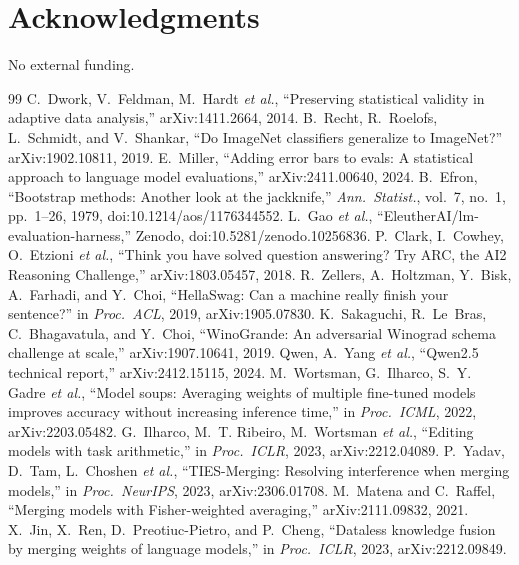 \documentclass[conference]{IEEEtran}
\begin{document}
\section*{Acknowledgments}
No external funding.

\begin{thebibliography}{99}
 C.~Dwork, V.~Feldman, M.~Hardt \emph{et al.}, ``Preserving statistical validity in adaptive data analysis,'' arXiv:1411.2664, 2014.
 B.~Recht, R.~Roelofs, L.~Schmidt, and V.~Shankar, ``Do ImageNet classifiers generalize to ImageNet?'' arXiv:1902.10811, 2019.
 E.~Miller, ``Adding error bars to evals: A statistical approach to language model evaluations,'' arXiv:2411.00640, 2024.
 B.~Efron, ``Bootstrap methods: Another look at the jackknife,'' \emph{Ann.\ Statist.}, vol.~7, no.~1, pp.~1--26, 1979, doi:10.1214/aos/1176344552.
 L.~Gao \emph{et al.}, ``EleutherAI/lm-evaluation-harness,'' Zenodo, doi:10.5281/zenodo.10256836.
 P.~Clark, I.~Cowhey, O.~Etzioni \emph{et al.}, ``Think you have solved question answering? Try ARC, the AI2 Reasoning Challenge,'' arXiv:1803.05457, 2018.
 R.~Zellers, A.~Holtzman, Y.~Bisk, A.~Farhadi, and Y.~Choi, ``HellaSwag: Can a machine really finish your sentence?'' in \emph{Proc.\ ACL}, 2019, arXiv:1905.07830.
 K.~Sakaguchi, R.~Le~Bras, C.~Bhagavatula, and Y.~Choi, ``WinoGrande: An adversarial Winograd schema challenge at scale,'' arXiv:1907.10641, 2019.
 Qwen, A.~Yang \emph{et al.}, ``Qwen2.5 technical report,'' arXiv:2412.15115, 2024.
 M.~Wortsman, G.~Ilharco, S.~Y. Gadre \emph{et al.}, ``Model soups: Averaging weights of multiple fine-tuned models improves accuracy without increasing inference time,'' in \emph{Proc.\ ICML}, 2022, arXiv:2203.05482.
 G.~Ilharco, M.~T. Ribeiro, M.~Wortsman \emph{et al.}, ``Editing models with task arithmetic,'' in \emph{Proc.\ ICLR}, 2023, arXiv:2212.04089.
 P.~Yadav, D.~Tam, L.~Choshen \emph{et al.}, ``TIES-Merging: Resolving interference when merging models,'' in \emph{Proc.\ NeurIPS}, 2023, arXiv:2306.01708.
 M.~Matena and C.~Raffel, ``Merging models with Fisher-weighted averaging,'' arXiv:2111.09832, 2021.
 X.~Jin, X.~Ren, D.~Preotiuc-Pietro, and P.~Cheng, ``Dataless knowledge fusion by merging weights of language models,'' in \emph{Proc.\ ICLR}, 2023, arXiv:2212.09849.

\end{thebibliography}
\end{document}
